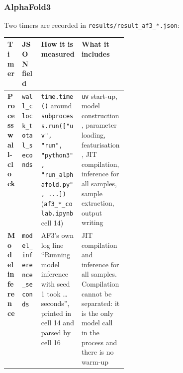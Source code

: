 \subsubsection{AlphaFold3}
\label{sec:meth-timing-af3}

Two timers are recorded in \texttt{results/\allowbreak{}result\_\allowbreak{}af3\_\allowbreak{}*.json}:

\begin{center}\small
\begin{tabularx}{\linewidth}{>{\raggedright\arraybackslash}p{0.12\linewidth}>{\raggedright\arraybackslash}p{0.16\linewidth}>{\raggedright\arraybackslash}X>{\raggedright\arraybackslash}X}
\toprule
Timer & JSON field & How it is measured & What it includes \\
\midrule
\textbf{Process wall-clock} & \texttt{wall\_\allowbreak{}clock\_\allowbreak{}total\_\allowbreak{}seconds} & \texttt{time.time()} around \texttt{subprocess.run(["uv", "run", "python3", "run\_\allowbreak{}alphafold.py", ...])} (\texttt{af3\_*\_colab.ipynb} cell 14) & \texttt{uv} start-up, model construction, parameter loading, featurisation, JIT compilation, inference for all samples, sample extraction, output writing \\
\textbf{Model inference} & \texttt{model\_\allowbreak{}inference\_\allowbreak{}seconds} & AF3's own log line ``Running model inference with seed 1 took \ldots{} seconds'', printed in cell 14 and parsed by cell 16 & JIT compilation and inference for all samples. Compilation cannot be separated: it is the only model call in the process and there is no warm-up \\
\bottomrule
\end{tabularx}
\end{center}

